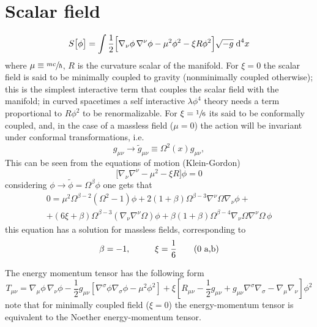 \section{Scalar field}
\begin{equation}
	S\big[\phi\big]=\int\frac{1}{2}\Big[\nabla_\nu\phi\,\nabla^\nu\phi-\mu^2\phi^2-\xi R\phi^2\Big]\sqrt{-g}\;\text{d}^4 x
\end{equation}
where $\mu\equiv\sfrac{m c}{\hbar}$, $R$ is the curvature scalar of the manifold. For $\xi=0$ the scalar field is said to be minimally coupled to gravity (nonminimally coupled otherwise); this is the simplest interactive term that couples the scalar field with the manifold; in curved spacetimes \cite{Bunch_Renorm} a self interactive $\lambda\phi^4$ theory needs a term proportional to $R\phi^2$ to be renormalizable. For $\xi=\sfrac{1}{6}$ its said to be conformally coupled, and, in the case of a massless field ($\mu=0$) the action will be invariant under conformal transformations, i.e.
\begin{equation}
	g_{\mu\nu}\rightarrow \tilde{g}_{\mu\nu}\equiv \Omega^2(x)g_{\mu\nu},
\end{equation}
This can be seen from the equations of motion (Klein-Gordon)
\begin{equation}
	\big[\nabla_\nu\nabla^\nu-\mu^2-\xi R\big]\phi=0
\end{equation}
considering $\phi\rightarrow\tilde{\phi}=\Omega^\beta\phi$ one gets that
\begin{multline}
	0=\mu^2\Omega^{\beta-2}\left(\Omega^2-1\right)\phi+2\left(1+\beta\right)\Omega^{\beta-3}\nabla^\nu\Omega\nabla_\nu\phi+\\
	+(6\xi+\beta)\Omega^{\beta-3}\left(\nabla_\nu\nabla^\nu\Omega\right)\phi+\beta(1+\beta)\Omega^{\beta-4}\nabla_\nu\Omega\nabla^\nu\Omega\,\phi
\end{multline}
this equation has a solution for massless fields, corresponding to
\begin{subequations}
	\begin{gather}
		\beta=-1,\hspace{1.0cm} \xi=\frac{1}{6}\tag{\theequation \,\,a,b}
	\end{gather}
\end{subequations}

The energy momentum tensor has the following form
\begin{equation}
	T_{\mu\nu}=\nabla_\mu\phi\,\nabla_\nu\phi -\frac{1}{2}g_{\mu\nu}\left[\nabla^\sigma\phi\nabla_\sigma\phi-\mu^2\phi^2\right]+\xi\left[R_{\mu\nu}-\frac{1}{2}g_{\mu\nu}+g_{\mu\nu}\nabla^\sigma\nabla_\sigma-\nabla_\mu\nabla_\nu\right]\phi^2
\end{equation}
note that for minimally coupled field ($\xi=0$) the energy-momentum tensor is equivalent to the Noether energy-momentum tensor.

